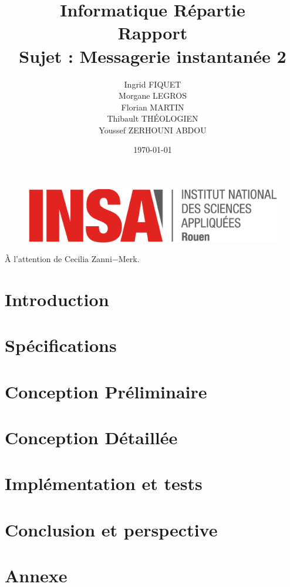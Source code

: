 \documentclass[a4paper,12pt]{article}
\title{Informatique Répartie\\Rapport\\Sujet : Messagerie instantanée 2}
\author{Ingrid FIQUET\\Morgane LEGROS\\Florian MARTIN\\Thibault THÉOLOGIEN\\Youssef ZERHOUNI ABDOU}
\date{\today}
\begin{document}
	\begin{titlepage}
		\vfill
		\begin{figure}
			\includegraphics[scale=0.3]{img/logoINSARouen.png}
		\end{figure}

		\maketitle
		
		\begin{center}
			\addvspace{10mm}
			À l'attention de Cecilia Zanni$-$Merk.
		\end{center}

		\vfill
		\noindent \hrulefill

	\end{titlepage}



\newpage
\tableofcontents{}

\newpage
\part*{Introduction} 
	

\newpage
\part{Spécifications}
	
	
\newpage
\part{Conception Préliminaire}
	
	
\newpage
\part{Conception Détaillée}
	

\newpage
\part{Implémentation et tests}
	
	
\newpage
\part*{Conclusion et perspective}
	

\newpage
\part*{Annexe}
\end{document}
